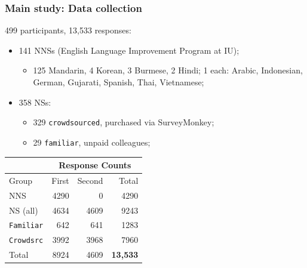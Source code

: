 \documentclass[handout,xcolor={dvipsnames}]{beamer}
\newcommand{\param}[1]{\texttt{#1}}
\begin{document}
\begin{frame}
\frametitle{Main study: Data collection}
\vspace{.5em}
499 participants, 13,533 responses:
\begin{itemize}
\item 141 NNSs (English Language Improvement Program at IU);
\begin{itemize}
\item 125 Mandarin, 4 Korean, 3 Burmese, 2 Hindi; 1 each: Arabic, Indonesian, German, Gujarati, Spanish, Thai, Vietnamese;
\end{itemize}
\vspace{.2em}
\item 358 NSs:
\begin{itemize}
\item 329 \param{crowdsourced}, purchased via SurveyMonkey;
\item 29 \param{familiar}, unpaid colleagues;
\end{itemize}
\end{itemize}

\vspace{-.2em}
\begin{small}
\begin{table}[htb!]
\begin{center}
\begin{tabular}{|l||r|r||r|}
\hline
& \multicolumn{3}{c|}{Response Counts} \\
\hline
 Group & First & Second & Total \\
\hline
\hline
NNS & 4290 & 0 & 4290 \\
\hline
\hline
NS (all) & 4634 & 4609 & 9243 \\ %
\hline
\multicolumn{1}{|r||}{\param{Familiar}} & 642 & 641 & 1283 \\ 
\hline
\multicolumn{1}{|r||}{\param{Crowdsrc}} & 3992 & 3968 & 7960 \\
\hline
\hline
Total & 8924 & 4609 & \textbf{13,533} \\
\hline
\end{tabular}
\end{center}
\end{table}
\end{small}

\end{frame}
\end{document}
